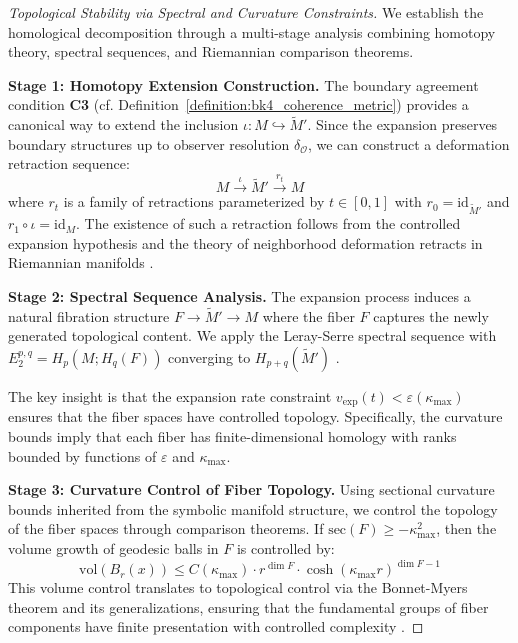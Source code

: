 \begin{proof}[Topological Stability via Spectral and Curvature Constraints]
\label{proof:bk4_topological_stability_via_spectral_and_curvature_constraints}
We establish the homological decomposition through a multi-stage analysis combining homotopy theory, spectral sequences, and Riemannian comparison theorems.

\textbf{Stage 1: Homotopy Extension Construction.} 
The boundary agreement condition \textbf{C3} (cf. Definition~\ref{definition:bk4_coherence_metric}) provides a canonical way to extend the inclusion $\iota: M \hookrightarrow \widetilde{M}'$. Since the expansion preserves boundary structures up to observer resolution $\delta_{\mathcal{O}}$, we can construct a deformation retraction sequence:
\[
M \xrightarrow{\iota} \widetilde{M}' \xrightarrow{r_t} M
\]
where $r_t$ is a family of retractions parameterized by $t \in [0,1]$ with $r_0 = \text{id}_{\widetilde{M}'}$ and $r_1 \circ \iota = \text{id}_M$. The existence of such a retraction follows from the controlled expansion hypothesis and the theory of neighborhood deformation retracts in Riemannian manifolds \cite{hatcher2002algebraic}.

\textbf{Stage 2: Spectral Sequence Analysis.}
The expansion process induces a natural fibration structure $F \to \widetilde{M}' \to M$ where the fiber $F$ captures the newly generated topological content. We apply the Leray-Serre spectral sequence with $E_2^{p,q} = H_p(M; H_q(F))$ converging to $H_{p+q}(\widetilde{M}')$ \cite{mccleary2001user}.

The key insight is that the expansion rate constraint $v_{\text{exp}}(t) < \varepsilon(\kappa_{\max})$ ensures that the fiber spaces have controlled topology. Specifically, the curvature bounds imply that each fiber has finite-dimensional homology with ranks bounded by functions of $\varepsilon$ and $\kappa_{\max}$.

\textbf{Stage 3: Curvature Control of Fiber Topology.}
Using sectional curvature bounds inherited from the symbolic manifold structure, we control the topology of the fiber spaces through comparison theorems. If $\text{sec}(F) \geq -\kappa_{\max}^2$, then the volume growth of geodesic balls in $F$ is controlled by:
\[
\text{vol}(B_r(x)) \leq C(\kappa_{\max}) \cdot r^{\dim F} \cdot \cosh(\kappa_{\max} r)^{\dim F - 1}
\]
This volume control translates to topological control via the Bonnet-Myers theorem and its generalizations, ensuring that the fundamental groups of fiber components have finite presentation with controlled complexity \cite{petersen2006riemannian}.


\end{proof}

